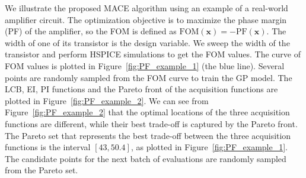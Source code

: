 We illustrate the proposed MACE algorithm using an example of a real-world amplifier circuit. The optimization objective is to maximize the phase margin (PF) of the amplifier, so the FOM is defined as $\mathrm{FOM}(\bm{x}) = - \mathrm{PF}(\bm{x})$. The width of one of its transistor is the design variable. We sweep the width of the transistor and perform HSPICE simulations to get the FOM values. The curve of FOM values is plotted in Figure~\ref{fig:PF_example_1} (the blue line). Several points are randomly sampled from the FOM curve to train the GP model. The LCB, EI, PI functions and the Pareto front of the acquisition functions are plotted in Figure~\ref{fig:PF_example_2}. We can see from Figure~\ref{fig:PF_example_2} that the optimal locations of the three acquisition functions are different, while their best trade-off is captured by the Pareto front. The Pareto set that represents the best trade-off between the three acquisition functions is the interval $[43, 50.4]$, as plotted in Figure~\ref{fig:PF_example_1}. The candidate points for the next batch of evaluations are randomly sampled from the Pareto set.


